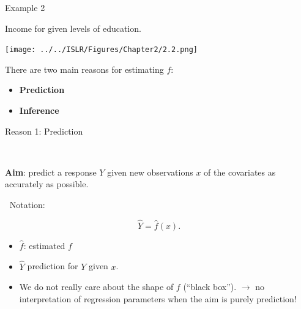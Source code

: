 \documentclass[ignorenonframetext,]{beamer}
\begin{document}
\begin{frame}{Example 2}

Income for given levels of education.

\texttt{[image: ../../ISLR/Figures/Chapter2/2.2.png]}

\end{frame}

\begin{frame}

There are two main reasons for estimating \(f\):

\begin{itemize}
\item
  \textbf{Prediction}
\item
  \textbf{Inference}
\end{itemize}

\end{frame}

\begin{frame}

\begin{block}{Reason 1: Prediction}

\(~\)

\textbf{Aim}: predict a response \(Y\) given new observations \(x\) of
the covariates as accurately as possible.

\(~\) Notation:

\[\hat{Y} = \hat{f}(x).\]

\begin{itemize}
\item
  \(\hat{f}\): estimated \(f\)
\item
  \(\hat{Y}\) prediction for \(Y\) given \(x\).
\item
  We do not really care about the shape of \(f\) (``black box'').
  \(\rightarrow\) no interpretation of regression parameters when the
  aim is purely prediction!
\end{itemize}

\end{block}

\end{frame}
\end{document}
